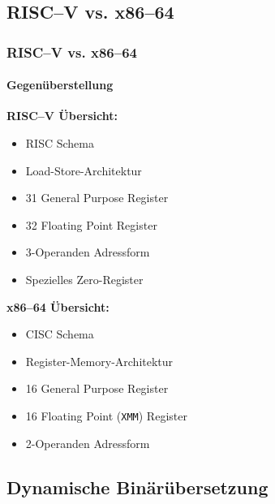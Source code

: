\subsection{RISC--V vs. x86--64} %
\begin{frame}
    \frametitle{RISC--V vs. x86--64}
    \framesubtitle{Gegenüberstellung}

    \begin{minipage}[t]{.47\textwidth}
        \textbf{RISC--V Übersicht:}

        \begin{itemize}
            \item RISC Schema
            \item Load-Store-Architektur
            \item 31 General Purpose Register
            \item 32 Floating Point Register
            \item 3-Operanden Adressform
            \item Spezielles Zero-Register
        \end{itemize}
    \end{minipage}
    \begin{minipage}[t]{.47\textwidth}
        \textbf{x86--64 Übersicht:}

        \begin{itemize}
            \item CISC Schema
            \item Register-Memory-Architektur
            \item 16 General Purpose Register
            \item 16 Floating Point (\texttt{XMM}) Register
            \item 2-Operanden Adressform
        \end{itemize}
    \end{minipage}
\end{frame}

\subsection{Dynamische Binärübersetzung} %

